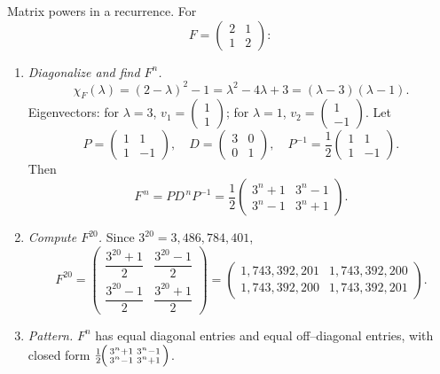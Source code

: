 \documentclass[11pt]{article}
\def\textbf#1{#1}%
\def\mathbf#1{#1}%
\begin{document}

\begin{solution}
\textbf{Matrix powers in a recurrence.} For
\[
F=\begin{pmatrix}2&1\\[2pt]1&2\end{pmatrix}:
\]
\begin{enumerate}
\item \emph{Diagonalize and find $F^{n}$.}
\[
\chi_F(\lambda)=(2-\lambda)^2-1=\lambda^2-4\lambda+3=(\lambda-3)(\lambda-1).
\]
Eigenvectors: for $\lambda=3$, $\mathbf{v}_1=\begin{pmatrix}1\\[2pt]1\end{pmatrix}$; for $\lambda=1$, $\mathbf{v}_2=\begin{pmatrix}1\\[2pt]-1\end{pmatrix}$.
Let
\[
P=\begin{pmatrix}1&1\\[2pt]1&-1\end{pmatrix},\quad
D=\begin{pmatrix}3&0\\[2pt]0&1\end{pmatrix},\quad
P^{-1}=\frac12\begin{pmatrix}1&1\\[2pt]1&-1\end{pmatrix}.
\]
Then
\[
F^{\,n}=P D^{\,n} P^{-1}
=\frac12\begin{pmatrix}3^n+1&3^n-1\\[2pt]3^n-1&3^n+1\end{pmatrix}.
\]

\item \emph{Compute $F^{20}$.} Since $3^{20}=3{,}486{,}784{,}401$,
\[
F^{20}=
\begin{pmatrix}
\dfrac{3^{20}+1}{2}&\dfrac{3^{20}-1}{2}\\[10pt]
\dfrac{3^{20}-1}{2}&\dfrac{3^{20}+1}{2}
\end{pmatrix}
=
\begin{pmatrix}
1{,}743{,}392{,}201&1{,}743{,}392{,}200\\[2pt]
1{,}743{,}392{,}200&1{,}743{,}392{,}201
\end{pmatrix}.
\]

\item \emph{Pattern.} $F^n$ has equal diagonal entries and equal off–diagonal entries,
with closed form $\tfrac12\!\begin{psmallmatrix}3^n+1&3^n-1\\ 3^n-1&3^n+1\end{psmallmatrix}$.
\end{enumerate}
\end{solution}
\end{document}
